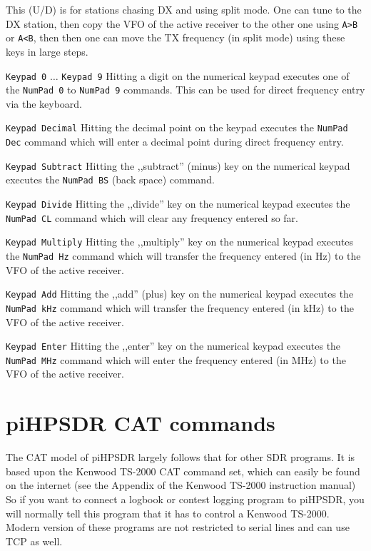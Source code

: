 \documentclass[12pt]{book}
\def\rett#1{\texttt{\color{red}#1}}
\def\bltt#1{\texttt{\color{blue}#1}}
\def\pH{pi\-HPSDR\xspace}
\begin{document}
This (U/D) is for stations chasing DX and using split mode. One can tune to the DX station,
then copy the VFO of the active receiver to the other one using \bltt{A>B} or \bltt{A<B}, then then
one can  move the TX frequency (in split mode) using these keys in large steps.

\rett{Keypad 0} $\ldots$ \rett{Keypad 9} Hitting a digit on the numerical keypad executes one of the
\bltt{NumPad 0} to \bltt{NumPad 9} commands. This can be used for direct frequency entry
via the keyboard.

\rett{Keypad Decimal} Hitting the decimal point on the keypad executes the \bltt{NumPad Dec}
command which will enter a decimal point during direct frequency entry.

\rett{Keypad Subtract} Hitting the ,,subtract'' (minus) key on the numerical keypad executes the
\bltt{NumPad BS} (back space) command.

\rett{Keypad Divide} Hitting the ,,divide'' key on the numerical keypad executes the \bltt{NumPad CL}
command which will clear any frequency entered so far.

\rett{Keypad Multiply} Hitting the ,,multiply'' key on the numerical keypad executes the \bltt{NumPad Hz}
command which will transfer the frequency entered (in Hz) to the VFO of the active receiver.

\rett{Keypad Add} Hitting the ,,add'' (plus) key on the numerical keypad executes the \bltt{NumPad kHz}
command which will transfer the frequency entered (in kHz) to the VFO of the active receiver.

\rett{Keypad Enter} Hitting the ,,enter'' key on the numerical keypad executes the \bltt{NumPad MHz}
command which will enter the frequency entered (in MHz) to the VFO of the active receiver.


\chapter{\pH CAT commands}
\label{sec:catcommands}
The CAT model of \pH largely follows that for other SDR programs. It is based upon the Kenwood TS-2000
CAT command
set, which can easily be found on the internet (see the Appendix of the Kenwood TS-2000 instruction manual)
So if you want to connect a logbook
or contest logging program to \pH, you will normally tell this program that it has to control a Kenwood
TS-2000. Modern version of these programs are not restricted to serial lines and can use TCP as well.
\end{document}
